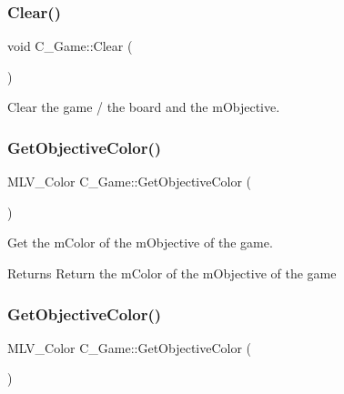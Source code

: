 \subsubsection{\texorpdfstring{Clear()}{Clear()}\hspace{0.1cm}{\footnotesize\ttfamily [2/2]}}
{\footnotesize\ttfamily void C\+\_\+\+Game\+::\+Clear (\begin{DoxyParamCaption}{ }\end{DoxyParamCaption})}



Clear the game / the board and the m\+Objective. 

\mbox{\label{classC__Game_a0efbb25a7daf4411b2dfe3055530ac85}} 
\subsubsection{\texorpdfstring{Get\+Objective\+Color()}{GetObjectiveColor()}\hspace{0.1cm}{\footnotesize\ttfamily [1/2]}}
{\footnotesize\ttfamily M\+L\+V\+\_\+\+Color C\+\_\+\+Game\+::\+Get\+Objective\+Color (\begin{DoxyParamCaption}{ }\end{DoxyParamCaption})}



Get the m\+Color of the m\+Objective of the game. 

\begin{DoxyReturn}{Returns}
Return the m\+Color of the m\+Objective of the game 
\end{DoxyReturn}
\mbox{\label{classC__Game_a0efbb25a7daf4411b2dfe3055530ac85}} 
\subsubsection{\texorpdfstring{Get\+Objective\+Color()}{GetObjectiveColor()}\hspace{0.1cm}{\footnotesize\ttfamily [2/2]}}
{\footnotesize\ttfamily M\+L\+V\+\_\+\+Color C\+\_\+\+Game\+::\+Get\+Objective\+Color (\begin{DoxyParamCaption}{ }\end{DoxyParamCaption})}



